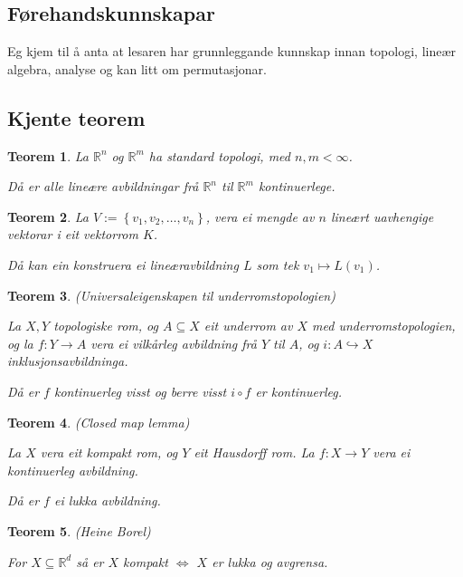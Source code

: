 \documentclass[a4paper, 12pt, norsk]{article}
\theoremstyle{plain}
\newtheorem{theorem}{Teorem}[section]
\theoremstyle{definition}
\newcommand{\Rb}{\mathbb{R}}
\newcommand{\set}[1]{ \left\{ #1 \right\} } %
\begin{document}
\subsection{Førehandskunnskapar}

Eg kjem til å anta at lesaren har grunnleggande kunnskap innan topologi, lineær algebra, analyse og kan litt om permutasjonar.

\subsection{Kjente teorem} %

\begin{theorem} \label{thm:avgrensa-lin-op-er-kont}
	La \( \Rb^n \) og \( \Rb^m \) ha standard topologi, med \( n, m < \infty \).

	Då er alle lineære avbildningar frå \( \Rb^n \) til \( \Rb^m \) kontinuerlege.
\end{theorem}

\begin{theorem} \label{thm:definer-lin-op}
	La \( V := \set{v_1, v_2, \dots, v_n} \), vera ei mengde av \( n \) lineært uavhengige vektorar i eit vektorrom \( K \).
	
	Då kan ein konstruera ei lineæravbildning \( L \) som tek \( v_1 \mapsto L(v_1) \).
\end{theorem}

\begin{theorem} \label{thm:universal-eigenskap-underromstopologi}
	(Universaleigenskapen til underromstopologien)

	La \( X, Y \) topologiske rom, og \( A \subseteq X \) eit underrom av \( X \) med underromstopologien, og la \( f: Y \to A \) vera ei vilkårleg avbildning frå \( Y \) til \( A \), og \( i: A \hookrightarrow X \) inklusjonsavbildninga. 
	
	Då er \( f \) kontinuerleg visst og berre visst \( i \circ f \) er kontinuerleg.
\end{theorem}

\begin{theorem} \label{thm:closed-map-lemma}
	(Closed map lemma)

	La \( X \) vera eit kompakt rom, og \( Y \) eit Hausdorff rom. La \( f: X \to Y \) vera ei kontinuerleg avbildning.

	Då er \( f \) ei lukka avbildning.
\end{theorem}

\begin{theorem} \label{thm:heine-borel} \cite[Teorem 5.1.16]{IntroTop}
	(Heine Borel)

	For \( X \subseteq \Rb^d \) så er \( X \) kompakt \( \iff \) \( X \) er lukka og avgrensa.
\end{theorem}
\end{document}

